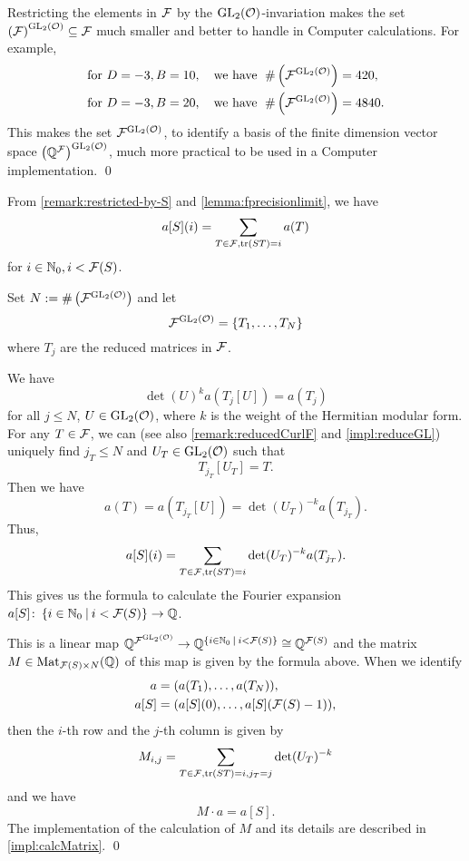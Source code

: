 \begin{remark}
Restricting the elements in $\mathcal{F}$ by the $\operatorname{GL}_2(\mathcal{O})$-invariation makes the set ${\left(\mathcal{F}\right)}^{\operatorname{GL}_2(\mathcal{O})} \subseteq \mathcal{F}$ much smaller and better to handle in Computer calculations.
For example,
\begin{align*}
& \text{for } D=-3, B=10,\quad \text{we have } \; \# \left({\mathcal{F}}^{\operatorname{GL}_2(\mathcal{O})}\right) = 420, \\
& \text{for } D=-3, B=20,\quad \text{we have } \; \# \left({\mathcal{F}}^{\operatorname{GL}_2(\mathcal{O})}\right) = 4840.
\end{align*}
%
This makes the set ${\mathcal{F}}^{\operatorname{GL}_2(\mathcal{O})}$, to identify a basis of the finite dimension vector space ${\left(\mathbb{Q}^{\mathcal{F}}\right)}^{\operatorname{GL}_2(\mathcal{O})}$, much more practical to be used in a Computer implementation.
\qed
\end{remark}

\begin{remark}
\label{remark:how-to-calc-aS}
From \cref{remark:restricted-by-S} and \cref{lemma:fprecisionlimit}, we have
\[ a[S] (i) = \sum_{T \in \mathcal{F}, \textup{\textrm{tr}}(S T) = i} a(T) \]
for $i \in \mathbb{N}_0, i < \mathcal{F}(S)$.

Set $N := \# \left( {\mathcal{F}}^{\operatorname{GL}_2(\mathcal{O})} \right)$ and let
\[ \invarF{\F}{\GL_2(\curlO)} = \Set{T_1, \dots, T_N} \]
where $T_j$ are the reduced matrices in $\mathcal{F}$.

We have
\[ \det(U)^k a(T_j[U]) = a(T_j) \] %
for all $j \le N$, $U \in \operatorname{GL}_2(\mathcal{O})$, where $k$ is the weight of the Hermitian modular form.
For any $T \in \mathcal{F}$, we can (see also \cref{remark:reducedCurlF} and \cref{impl:reduceGL}) uniquely find $j_T \le N$ and $U_T \in \operatorname{GL}_2(\mathcal{O})$ such that
\[ T_{j_T}[U_T] = T. \]
Then we have
\[ a(T) = a(T_{j_T}[U]) = \det(U_T)^{-k} a(T_{j_T}) . \]
Thus,
\[ a[S] (i) =  \sum_{T \in \mathcal{F}, \textup{\textrm{tr}}(S T) = i} \det(U_T)^{-k} a(T_{j_T}) . \]
This gives us the formula to calculate the Fourier expansion $a[S] \colon \Set{i \in \N_0}{i < \FPrecisionLimit{S}} \rightarrow \Q$.

This is a linear map $\Q^{\invarF{\F}{\GL_2(\curlO)}} \rightarrow \Q^{\Set{i \in \N_0}{i < \FPrecisionLimit{S}}} \cong \Q^{\FPrecisionLimit{S}}$ and the matrix $M \in \operatorname{Mat}_{\mathcal{F}(S) \times N}(\mathbb{Q})$ of this map is given by the formula above. When we identify
\begin{align*}
a = & \; (a(T_1), \dots, a(T_N)), \\
a[S] = & \; (a[S](0), \dots, a[S](\mathcal{F}(S) - 1)),
\end{align*}
then the $i$-th row and the $j$-th column is given by
\[ M_{i,j} =  \sum_{T \in \mathcal{F}, \textup{\textrm{tr}}(S T) = i, j_T = j} \det(U_T)^{-k} \]
and we have
\[ M \cdot a = a[S] . \]
The implementation of the calculation of $M$ and its details are described in \cref{impl:calcMatrix}.
\qed
\end{remark}


